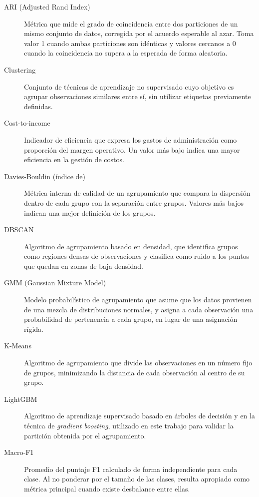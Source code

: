 \documentclass[11pt,a4paper]{article}
\begin{document}
\begin{description}
  \item[ARI (Adjusted Rand Index)] Métrica que mide el grado de coincidencia entre dos
  particiones de un mismo conjunto de datos, corregida por el acuerdo esperable al azar. Toma
  valor 1 cuando ambas particiones son idénticas y valores cercanos a 0 cuando la coincidencia
  no supera a la esperada de forma aleatoria.

  \item[Clustering] Conjunto de técnicas de aprendizaje no supervisado cuyo objetivo es agrupar
  observaciones similares entre sí, sin utilizar etiquetas previamente definidas.

  \item[Cost-to-income] Indicador de eficiencia que expresa los gastos de administración como
  proporción del margen operativo. Un valor más bajo indica una mayor eficiencia en la gestión
  de costos.

  \item[Davies-Bouldin (índice de)] Métrica interna de calidad de un agrupamiento que compara
  la dispersión dentro de cada grupo con la separación entre grupos. Valores más bajos indican
  una mejor definición de los grupos.

  \item[DBSCAN] Algoritmo de agrupamiento basado en densidad, que identifica grupos como
  regiones densas de observaciones y clasifica como ruido a los puntos que quedan en zonas de
  baja densidad.

  \item[GMM (Gaussian Mixture Model)] Modelo probabilístico de agrupamiento que asume que los
  datos provienen de una mezcla de distribuciones normales, y asigna a cada observación una
  probabilidad de pertenencia a cada grupo, en lugar de una asignación rígida.

  \item[K-Means] Algoritmo de agrupamiento que divide las observaciones en un número fijo de
  grupos, minimizando la distancia de cada observación al centro de su grupo.

  \item[LightGBM] Algoritmo de aprendizaje supervisado basado en árboles de decisión y en la
  técnica de \textit{gradient boosting}, utilizado en este trabajo para validar la partición
  obtenida por el agrupamiento.

  \item[Macro-F1] Promedio del puntaje F1 calculado de forma independiente para cada clase.
  Al no ponderar por el tamaño de las clases, resulta apropiado como métrica principal cuando
  existe desbalance entre ellas.


\end{description}
\end{document}
